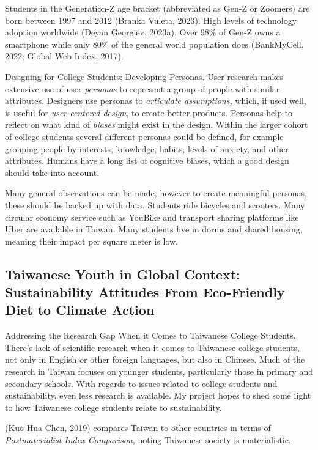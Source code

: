 \documentclass[
  12pt,
  letterpaper,
  DIV=11,
  numbers=noendperiod]{scrartcl}
\begin{document}
Students in the Generation-Z age bracket (abbreviated as Gen-Z or
Zoomers) are born between 1997 and 2012 (Branka Vuleta, 2023). High
levels of technology adoption worldwide (Deyan Georgiev, 2023a). Over
98\% of Gen-Z owns a smartphone while only 80\% of the general world
population does (BankMyCell, 2022; Global Web Index, 2017).

Designing for College Students: Developing Personas. User research makes
extensive use of user \emph{personas} to represent a group of people
with similar attributes. Designers use personas to \emph{articulate
assumptions,} which, if used well, is useful for \emph{user-centered
design}, to create better products. Personas help to reflect on what
kind of \emph{biases} might exist in the design. Within the larger
cohort of college students several different personas could be defined,
for example grouping people by interests, knowledge, habits, levels of
anxiety, and other attributes. Humans have a long list of cognitive
biases, which a good design should take into account.

Many general observations can be made, however to create meaningful
personas, these should be backed up with data. Students ride bicycles
and scooters. Many circular economy service such as YouBike and
transport sharing platforms like Uber are available in Taiwan. Many
students live in dorms and shared housing, meaning their impact per
square meter is low.

\subsection{Taiwanese Youth in Global Context: Sustainability Attitudes
From Eco-Friendly Diet to Climate
Action}\label{taiwanese-youth-in-global-context-sustainability-attitudes-from-eco-friendly-diet-to-climate-action}

Addressing the Research Gap When it Comes to Taiwanese College Students.
There's lack of scientific research when it comes to Taiwanese college
students, not only in English or other foreign languages, but also in
Chinese. Much of the research in Taiwan focuses on younger students,
particularly those in primary and secondary schools. With regards to
issues related to college students and sustainability, even less
research is available. My project hopes to shed some light to how
Taiwanese college students relate to sustainability.

(Kuo-Hua Chen, 2019) compares Taiwan to other countries in terms of
\emph{Postmaterialist Index Comparison}, noting Taiwanese society is
materialistic.
\end{document}
